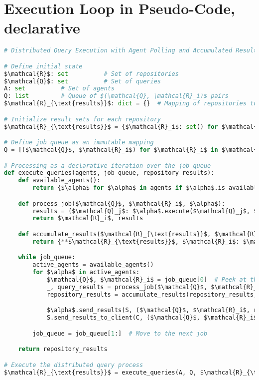 \documentclass[11pt]{article}
\begin{document}
\section{Execution Loop in Pseudo-Code, declarative}
\begin{listing}[H] %
  \caption{Distributed Query Execution Algorithm}

\begin{lstlisting}[language=Python]
# Distributed Query Execution with Agent Polling and Accumulated Results

# Define initial state
$\mathcal{R}$: set          # Set of repositories
$\mathcal{Q}$: set          # Set of queries
A: set          # Set of agents
Q: list         # Queue of $(\mathcal{Q}, \mathcal{R}_i)$ pairs
$\mathcal{R}_{\text{results}}$: dict = {}  # Mapping of repositories to their accumulated query results

# Initialize result sets for each repository
$\mathcal{R}_{\text{results}}$ = {$\mathcal{R}_i$: set() for $\mathcal{R}_i$ in $\mathcal{R}$}

# Define job queue as an immutable mapping
Q = [($\mathcal{Q}$, $\mathcal{R}_i$) for $\mathcal{R}_i$ in $\mathcal{R}$]

# Processing as a declarative iteration over the job queue
def execute_queries(agents, job_queue, repository_results):
    def available_agents():
        return {$\alpha$ for $\alpha$ in agents if $\alpha$.is_available()}

    def process_job($\mathcal{Q}$, $\mathcal{R}_i$, $\alpha$):
        results = {$\mathcal{Q}_j$: $\alpha$.execute($\mathcal{Q}_j$, $\mathcal{R}_i$) for $\mathcal{Q}_j$ in $\mathcal{Q}$}
        return $\mathcal{R}_i$, results

    def accumulate_results($\mathcal{R}_{\text{results}}$, $\mathcal{R}_i$, query_results):
        return {**$\mathcal{R}_{\text{results}}$, $\mathcal{R}_i$: $\mathcal{R}_{\text{results}}$[$\mathcal{R}_i$] | set().union(*query_results.values())}

    while job_queue:
        active_agents = available_agents()
        for $\alpha$ in active_agents:
            $\mathcal{Q}$, $\mathcal{R}_i$ = job_queue[0]  # Peek at the first job
            _, query_results = process_job($\mathcal{Q}$, $\mathcal{R}_i$, $\alpha$)
            repository_results = accumulate_results(repository_results, $\mathcal{R}_i$, query_results)

            $\alpha$.send_results(S, ($\mathcal{Q}$, $\mathcal{R}_i$, repository_results[$\mathcal{R}_i$]))
            S.send_results_to_client(C, ($\mathcal{Q}$, $\mathcal{R}_i$, repository_results[$\mathcal{R}_i$]))

        job_queue = job_queue[1:]  # Move to the next job

    return repository_results

# Execute the distributed query process
$\mathcal{R}_{\text{results}}$ = execute_queries(A, Q, $\mathcal{R}_{\text{results}}$)
\end{lstlisting}
\end{listing}
\FloatBarrier
\end{document}

